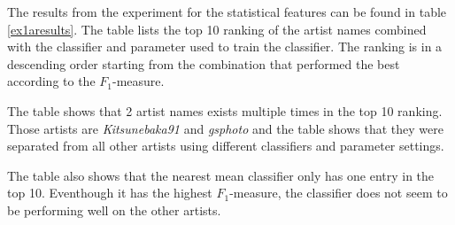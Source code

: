 The results from the experiment for the statistical features can be found in table \ref{ex1aresults}.
The table lists the top 10 ranking of the artist names combined with the classifier and parameter used to train the classifier.
The ranking is in a descending order starting from the combination that performed the best according to the $F_1$-measure.

The table shows that 2 artist names exists multiple times in the top 10 ranking.
Those artists are \textit{Kitsunebaka91} and \textit{gsphoto} and the table shows that they were separated from all other artists using different classifiers and parameter settings.

The table also shows that the nearest mean classifier only has one entry in the top 10.
Eventhough it has the highest $F_1$-measure, the classifier does not seem to be performing well on the other artists.


